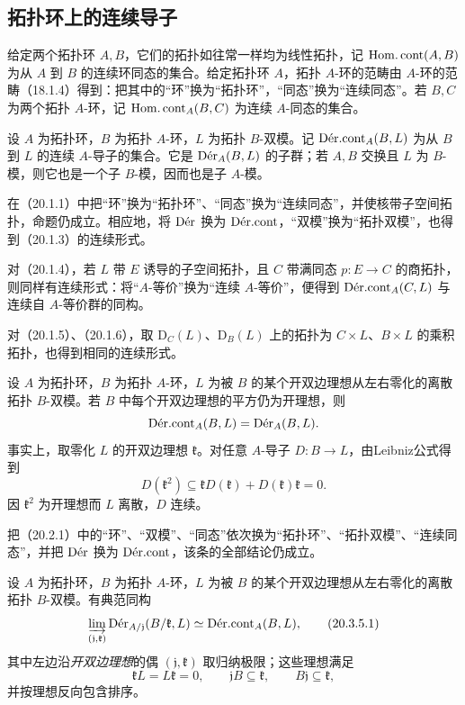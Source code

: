 \subsection{拓扑环上的连续导子}
给定两个拓扑环 $A,B$，它们的拓扑如往常一样均为线性拓扑，记 $\HomCont(A,B)$ 为从 $A$ 到 $B$ 的连续环同态的集合。给定拓扑环 $A$，拓扑 $A$-环的范畴由 $A$-环的范畴（18.1.4）得到：把其中的“环”换为“拓扑环”，“同态”换为“连续同态”。若 $B,C$ 为两个拓扑 $A$-环，记 $\HomCont_A(B,C)$ 为连续 $A$-同态的集合。

设 $A$ 为拓扑环，$B$ 为拓扑 $A$-环，$L$ 为拓扑 $B$-双模。记 $\DerCont_A(B,L)$ 为从 $B$ 到 $L$ 的连续 $A$-导子的集合。它是 $\Der_A(B,L)$ 的子群；若 $A,B$ 交换且 $L$ 为 $B$-模，则它也是一个子 $B$-模，因而也是子 $A$-模。

在（20.1.1）中把“环”换为“拓扑环”、“同态”换为“连续同态”，并使核带子空间拓扑，命题仍成立。相应地，将 $\Der$ 换为 $\DerCont$，“双模”换为“拓扑双模”，也得到（20.1.3）的连续形式。

对（20.1.4），若 $L$ 带 $E$ 诱导的子空间拓扑，且 $C$ 带满同态 $p:E\to C$ 的商拓扑，则同样有连续形式：将“$A$-等价”换为“连续 $A$-等价”，便得到 $\DerCont_A(C,L)$ 与连续自 $A$-等价群的同构。

对（20.1.5）、（20.1.6），取 $\mathrm D_C(L)$、$\mathrm D_B(L)$ 上的拓扑为 $C\times L$、$B\times L$ 的乘积拓扑，也得到相同的连续形式。

设 $A$ 为拓扑环，$B$ 为拓扑 $A$-环，$L$ 为被 $B$ 的某个开双边理想从左右零化的离散拓扑 $B$-双模。若 $B$ 中每个开双边理想的平方仍为开理想，则
\[
 \DerCont_A(B,L)=\Der_A(B,L).
\]
事实上，取零化 $L$ 的开双边理想 $\mathfrak k$。对任意 $A$-导子 $D:B\to L$，由Leibniz公式得到
\[
 D(\mathfrak k^2)\subseteq\mathfrak k D(\mathfrak k)+D(\mathfrak k)\mathfrak k=0.
\]
因 $\mathfrak k^2$ 为开理想而 $L$ 离散，$D$ 连续。

把（20.2.1）中的“环”、“双模”、“同态”依次换为“拓扑环”、“拓扑双模”、“连续同态”，并把 $\Der$ 换为 $\DerCont$，该条的全部结论仍成立。

设 $A$ 为拓扑环，$B$ 为拓扑 $A$-环，$L$ 为被 $B$ 的某个开双边理想从左右零化的离散拓扑 $B$-双模。有典范同构
\begin{equation}
 \varinjlim_{(\mathfrak j,\mathfrak k)}
 \Der_{A/\mathfrak j}(B/\mathfrak k,L)
 \simeq\DerCont_A(B,L),
 \tag{20.3.5.1}
\end{equation}
其中左边沿\emph{开双边理想}的偶 $(\mathfrak j,\mathfrak k)$ 取归纳极限；这些理想满足
\[
 \mathfrak kL=L\mathfrak k=0,\qquad
 \mathfrak jB\subseteq\mathfrak k,\qquad B\mathfrak j\subseteq\mathfrak k,
\]
并按理想反向包含排序。

